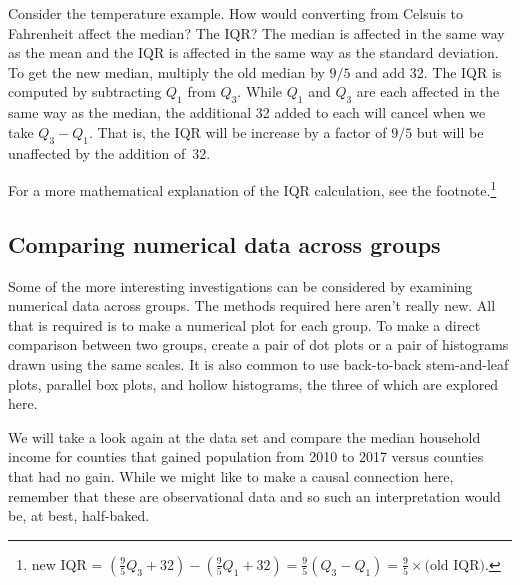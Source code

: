 \begin{examplewrap}
\begin{nexample}{Consider the temperature example. How would converting from Celsuis to Fahrenheit affect the median? The IQR?}
The median is affected in the same way as the mean and the IQR is affected in the same way as the standard deviation. To get the new median, multiply the old median by $9/5$ and add 32. The IQR is computed by subtracting $Q_1$ from $Q_3$. While $Q_1$ and $Q_3$ are each affected in the same way as the median, the additional 32 added to each will cancel when we take $Q_3 - Q_1$. That is, the IQR will be increase by a factor of $9/5$ but will be unaffected by the addition of~32.

For a more mathematical explanation of the IQR calculation, see the footnote.\footnote{new IQR = $\left(\frac{9}{5} Q_3 + 32\right) - \left(\frac{9}{5} Q_1 + 32\right) = \frac{9}{5} \left(Q_3 - Q_1\right) = \frac{9}{5} \times \text{(old IQR)}$.}
\end{nexample}
\end{examplewrap}

\subsection{Comparing numerical data across groups}
\label{comparingAcrossGroups}




Some of the more interesting investigations can be considered by examining numerical data across groups. The methods required here aren't really new. All that is required is to make a numerical plot for each group. To make a direct comparison between two groups, create a pair of dot plots or a pair of histograms drawn using the same scales. It is also common to use back-to-back stem-and-leaf plots, parallel box plots, and hollow histograms, the three of which are explored here.

We will take a look again at the  data set
and compare the median household income for counties that
gained population from 2010 to 2017 versus counties that
had no gain.
While we might like to make a causal connection here,
remember that these are observational data and so such
an interpretation would be, at best, half-baked.

\newcommand{\numcountieswithgains}{1454}
\newcommand{\numcountieswithgainsC}{1,454}
\newcommand{\numcountieswithoutgains}{1672}
\newcommand{\numcountieswithoutgainsC}{1,672}

